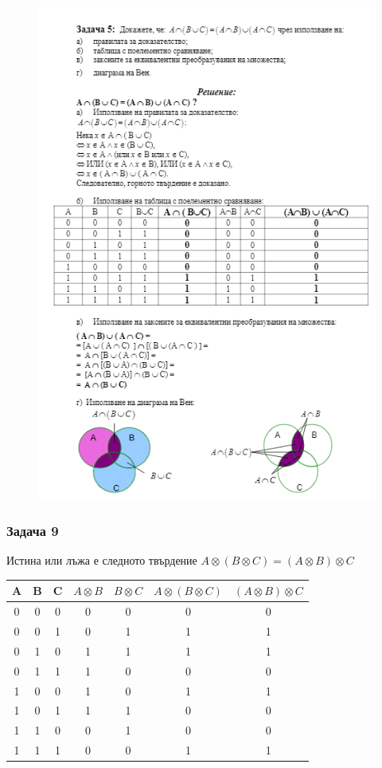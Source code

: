 \documentclass[fleqn, 12pt]{article}
\theoremstyle{definition}
\begin{document}
\begin{figure}[h!]
\includegraphics{Pics/Discrete math/ex3/ex3-task5.png}
\end{figure}

\newpage
\subsubsection*{Задача 9}
Истина или лъжа е следното твърдение $A \otimes (B \otimes C) = (A \otimes B) \otimes C$
\begin{table}[htp]
\begin{center}
\begin{tabular}{|c|c|c|c|c|c|c|} 
\hline
 A & B & C  & $A \otimes B$ & $B \otimes C$ & $A \otimes (B \otimes C)$ & $(A \otimes B) \otimes C$  \\
\hline
0 & 0 & 0 & 0 & 0 & 0 & 0 \\
\hline
0 & 0 & 1 & 0 & 1 & 1 & 1 \\
\hline
0 & 1 & 0 & 1 & 1 & 1 & 1 \\
\hline
0 & 1 & 1 & 1 & 0 & 0 & 0 \\
\hline
1 & 0 & 0 & 1 & 0 & 1 & 1 \\
\hline
1 & 0 & 1 & 1 & 1 & 0 & 0 \\
\hline
1 & 1 & 0 & 0 & 1 & 0 & 0 \\
\hline
1 & 1 & 1 & 0 & 0 & 1 & 1 \\
\hline
\end{tabular}
\end{center}
\end{table}
\newpage
\end{document}
